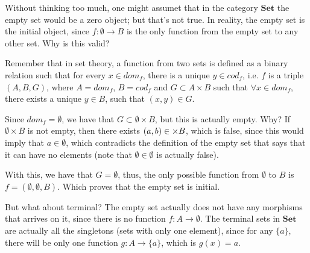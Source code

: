 \begin{example}
Without thinking too much, one might assumet that in the category $\mathbf{Set}$
the empty set would be a zero object; but that's not true.
In reality, the empty set is the initial object, since $f:\emptyset \to B$
is the only function from the empty set to any other set. Why is this valid?

Remember that in set theory, a function from two sets is defined as a binary
relation such that for every $x \in dom_f$, there is a unique $y \in cod_f$, i.e.
$f$ is a triple $(A,B,G)$, where $A = dom_f$, $B = cod_f$ and $G \subset A \times B$
such that $\forall x \in dom_f$, there exists a unique $y \in B$, such that $(x,y) \in G$.

Since $dom_f = \emptyset$, we have that $G \subset \emptyset \times B$, but this
is actually empty. Why? If $\emptyset \times B$ is not empty, then there exists
$(a,b) \in \empty \times B$, which is false, since this would imply that
$a \in \emptyset$, which contradicts the definition of the empty set that says
that it can have no elements (note that $\emptyset \in \emptyset$ is actually false).

With this, we have that $G = \emptyset$, thus, the only possible function from
$\emptyset$ to $B$ is $f = (\emptyset, \emptyset, B)$. Which proves that the
empty set is initial.

But what about terminal? The empty set actually does not have any morphisms
that arrives on it, since there is no function $f:A \to \emptyset$.
The terminal sets in $\mathbf{Set}$ are actually all the singletons (sets with only
one element), since for any $\{a\}$, there will be only one function
$g: A \to \{a\}$, which is $g(x) = a$.
\end{example}

